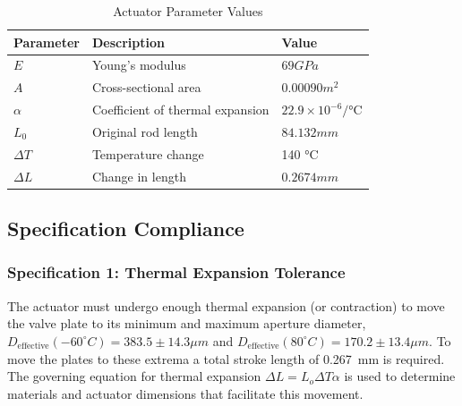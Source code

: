 \documentclass[12pt, letterpaper]{report}%
\newcounter{mycounter}           %
\newcounter{sub}[mycounter]      %
\newcommand{\degC}{^{\circ}C}    %
\newcommand{\coldBoundary}{D_{\text{effective}}(-60\degC) = 383.5 \pm 14.3 \mu m}
\newcommand{\hotBoundary}{D_{\text{effective}}(80\degC) = 170.2 \pm 13.4 \mu m}
\newcommand{\specStroke}{0.267} %
\newcommand{\specActuatorCTE}{22.9 \times 10^{-6} \si{\per\celsius}} %
\newcommand{\specYoungMActuator}{69 GPa}
\newcommand{\specCrossSectArea}{0.00090 m^2}
\newcommand{\specOrigActuatorLength}{84.132 mm}
\newcommand{\specTempChange}{140 \si{\celsius}}
\newcommand{\specLengthChange}{0.2674 mm}
\begin{document}
        \begin{table}[H]
            \centering
            \caption{Actuator Parameter Values}
            \label{tab:actuator_parameters}
            \begin{tabularx}{\textwidth}{l X l}
                \toprule
                \textbf{Parameter} & \textbf{Description} & \textbf{Value} \\
                \midrule
                $E$ &
                Young's modulus &
                $\specYoungMActuator$
                \\\addlinespace
                $A$ &
                Cross-sectional area &
                $\specCrossSectArea$
                \\\addlinespace
                $\alpha$ &
                Coefficient of thermal expansion &
               $ \specActuatorCTE$
                \\\addlinespace
                $L_0$ &
                Original rod length &
                $\specOrigActuatorLength$
                \\\addlinespace
                $\Delta T$ &
                Temperature change &
                \specTempChange
                \\\addlinespace
                $\Delta L$ &
                Change in length &
                $\specLengthChange$
                \\\bottomrule
            \end{tabularx}
        \end{table}

        \subsection{Specification Compliance}
    \subsubsection{Specification 1: Thermal Expansion Tolerance}
        \label{subsec:act_spec_1}

            The actuator must undergo enough thermal expansion (or contraction) to move the valve plate
            to its minimum and maximum aperture diameter, $\coldBoundary$ and $\hotBoundary$. To move the plates
            to these extrema a total stroke length of \specStroke\ mm is required. The governing equation
            for thermal expansion $\Delta L = L_o\Delta T\alpha $ is used to determine materials and actuator
            dimensions that facilitate this movement. 
\end{document}
